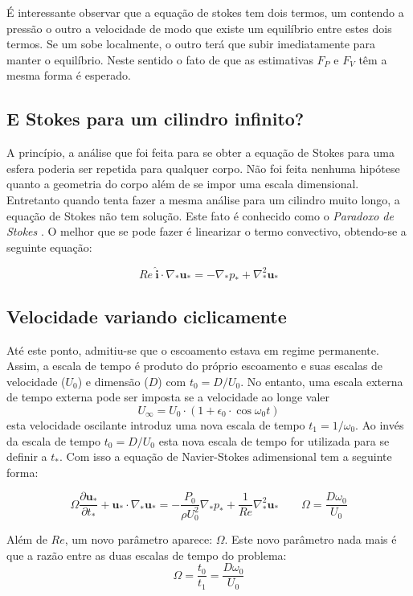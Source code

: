 \documentclass[article,12pt,oneside,a4paper,english,brazil,sumario=tradicional]{abntex2}
\newcommand{\p}[1]{\ensuremath{ \mathbf{#1}}}    %
\newcommand{\pd}{\ensuremath{\partial}}
\begin{document}
É interessante observar que a equação de stokes tem dois termos, um contendo a pressão o outro a velocidade de modo que existe um equilíbrio entre estes dois termos. Se um sobe localmente, o outro terá que subir imediatamente para manter o equilíbrio. Neste sentido o fato de que as estimativas $F_P$ e $F_V$ têm a mesma forma é esperado.

\subsection{E Stokes para um cilindro infinito?}
A princípio, a análise que foi feita para se obter a equação de Stokes para uma esfera poderia ser repetida para qualquer corpo. Não foi feita nenhuma hipótese quanto a geometria do corpo além de se impor uma escala dimensional. Entretanto quando tenta fazer a mesma análise para um cilindro muito longo, a equação de Stokes não tem solução. Este fato é conhecido como o \emph{Paradoxo de Stokes} \cite{Birkhoff60}. O melhor que se pode fazer é linearizar o termo convectivo, obtendo-se a seguinte equação:

\[
Re\:\hat{\p{i}}\cdot\nabla_*\p{u_*} = -\nabla_* p_* + \nabla_*^2\p{u}_*
\]

\subsection{Velocidade variando ciclicamente}
Até este ponto, admitiu-se que o escoamento estava em regime permanente. Assim, a escala de tempo é produto do próprio escoamento e suas escalas de velocidade ($U_0$) e dimensão ($D$) com $t_0 = D/U_0$. No entanto, uma escala externa de tempo externa pode ser imposta se a velocidade ao longe valer
\[
U_\infty = U_0\cdot\left(1 + \epsilon_0\cdot\cos \omega_0 t\right)
\]
esta velocidade oscilante introduz uma nova escala de tempo $t_1 = 1/\omega_0$. Ao invés da escala de tempo $t_0 = D/U_0$ esta nova escala de tempo for utilizada para se definir a $t_*$. Com isso a equação de Navier-Stokes adimensional tem a seguinte forma:

\begin{equation}
\Omega\frac{\pd\p{u}_*}{\pd t_*} + \p{u}_*\cdot\nabla_*\p{u_*} = -\frac{P_0}{\rho U_0^2}\nabla_* p_* + \frac{1}{Re}\nabla_*^2\p{u}_*  \qquad \Omega = \frac{D\omega_0}{U_0}
\label{eq:nstemp}
\end{equation}

Além de $Re$, um novo parâmetro aparece: $\Omega$. Este novo parâmetro nada mais é que a razão entre as duas escalas de tempo do problema:
\[
\Omega = \frac{t_0}{t_1} = \frac{D\omega_0}{U_0}
\]
\end{document}
